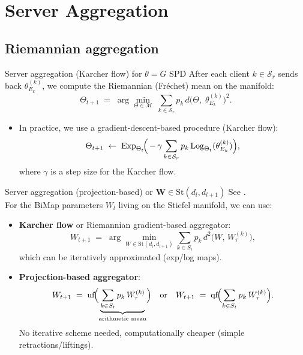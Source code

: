 \documentclass[aspectratio=169,xcolor=dvipsnames]{beamer}
\begin{document}
\section{Server Aggregation}
\subsection{Riemannian aggregation}
\begin{frame}{Server aggregation (Karcher flow) for $\theta=G$ SPD}
After each client $k \in \mathcal{S}_r$ sends back $\theta_{E_k}^{(k)}$, we compute the Riemannian (Fréchet) mean on the manifold:
\[
  \Theta_{t+1} \;=\; 
    \arg\min_{\Theta\in\mathcal{M}} \;\sum_{k\in \mathcal{S}_r} p_k\,d\bigl(\Theta,\;\theta_{E_k}^{(k)}\bigr)^2.
\]
\begin{itemize}
\item In practice, we use a gradient-descent-based procedure (Karcher flow):
\[
   \Theta_{t+1} 
   \;\leftarrow\; 
   \mathrm{Exp}_{\Theta_{t}}\!\Bigl(\,-\,\gamma\sum_{k\in \mathcal{S}_r} 
   p_k\,\mathrm{Log}_{\Theta_{t}}(\theta_{E_k}^{(k)})\Bigr),
\]
where $\gamma$ is a step size for the Karcher flow.
\end{itemize}

\end{frame}




\begin{frame}{Server aggregation (projection-based) or \(\mathbf{W}\in \mathrm{St}(d_l,d_{l+1})\)}
See \cite{bouchard2025beyond}. \\For the BiMap parameters \(W_l\) living on the Stiefel manifold, we can use:

\begin{itemize}
    \item \textbf{Karcher flow} or Riemannian gradient-based aggregator: 
    \[
      W_{t+1}
      \;=\;
      \arg\!\min_{W\in \mathrm{St}(d_l,d_{l+1})}
      \sum_{k\in S_t} p_k\,d^2\bigl(W,\,W_{\tau}^{(k)}\bigr),
    \]
    which can be iteratively approximated (exp/log maps).
    \item \textbf{Projection-based aggregator}:
    \[
      W_{t+1}
      \;=\; \mathrm{uf}\!\Bigl(\underbrace{\sum_{k\in S_t}p_k\,W_{\tau}^{(k)}}_{\text{arithmetic mean}}\Bigr)
      \quad\text{or}\quad
      W_{t+1}
      \;=\; \mathrm{qf}\!\Bigl(\sum_{k\in S_t}p_k\,W_{\tau}^{(k)}\Bigr).
    \]
     No iterative scheme needed, computationally cheaper (simple retractions/liftings).
\end{itemize}
\end{frame}
\end{document}
